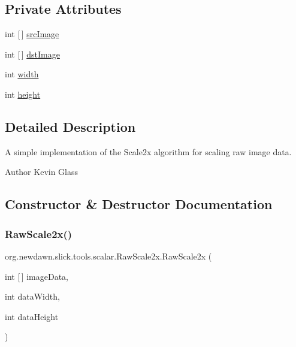 \subsection*{Private Attributes}
\begin{DoxyCompactItemize}
\item 
int \mbox{[}$\,$\mbox{]} \mbox{\hyperlink{classorg_1_1newdawn_1_1slick_1_1tools_1_1scalar_1_1_raw_scale2x_a5ceee85c3e6cf53370f34690ef527cb7}{src\+Image}}
\item 
int \mbox{[}$\,$\mbox{]} \mbox{\hyperlink{classorg_1_1newdawn_1_1slick_1_1tools_1_1scalar_1_1_raw_scale2x_a27247e8c178805c2736db5f93ea8341e}{dst\+Image}}
\item 
int \mbox{\hyperlink{classorg_1_1newdawn_1_1slick_1_1tools_1_1scalar_1_1_raw_scale2x_ac44a63899fa4a47dacffcf3c3fbc5526}{width}}
\item 
int \mbox{\hyperlink{classorg_1_1newdawn_1_1slick_1_1tools_1_1scalar_1_1_raw_scale2x_aadc4e62f40dbfa6633ca33b180aeea88}{height}}
\end{DoxyCompactItemize}


\subsection{Detailed Description}
A simple implementation of the Scale2x algorithm for scaling raw image data.

\begin{DoxyAuthor}{Author}
Kevin Glass 
\end{DoxyAuthor}


\subsection{Constructor \& Destructor Documentation}
\mbox{\label{classorg_1_1newdawn_1_1slick_1_1tools_1_1scalar_1_1_raw_scale2x_a10575ba9d5027a48f73e3c13db0b9356}} 
\subsubsection{\texorpdfstring{Raw\+Scale2x()}{RawScale2x()}}
{\footnotesize\ttfamily org.\+newdawn.\+slick.\+tools.\+scalar.\+Raw\+Scale2x.\+Raw\+Scale2x (\begin{DoxyParamCaption}\item[{int \mbox{[}$\,$\mbox{]}}]{image\+Data,  }\item[{int}]{data\+Width,  }\item[{int}]{data\+Height }\end{DoxyParamCaption})\hspace{0.3cm}{\ttfamily [inline]}}

